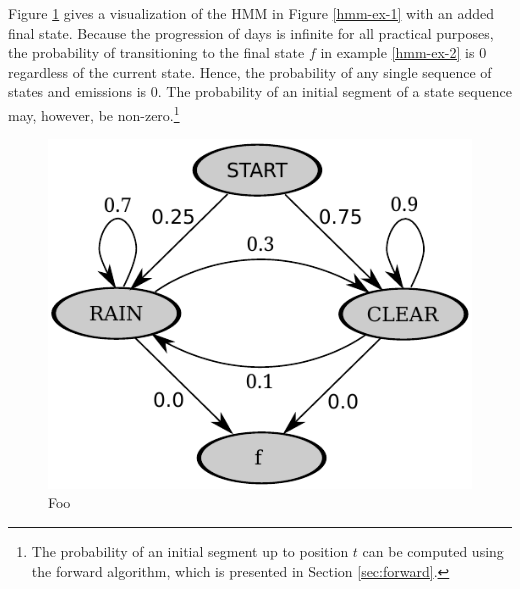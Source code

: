 Figure \ref{hmm-ex-3} gives a visualization of the HMM in Figure \ref{hmm-ex-1} with an added final state. 
Because the progression of days is infinite for all practical purposes, the
probability of transitioning to the final state $f$ in example
\ref{hmm-ex-2} is 0 regardless of the current state. Hence, the
probability of any single sequence of states and emissions is
0. The probability of an initial segment of a state sequence
may, however, be non-zero.\footnote{The probability of an initial segment
  up to position $t$ can be computed using the forward algorithm,
  which is presented in Section \ref{sec:forward}.}%

\begin{figure}[!htb]
\begin{center}
\caption{Foo}\label{hmm-ex-3}
\includegraphics[scale=0.8]{hmm-ex-graph-2}
\end{center}
\end{figure}

